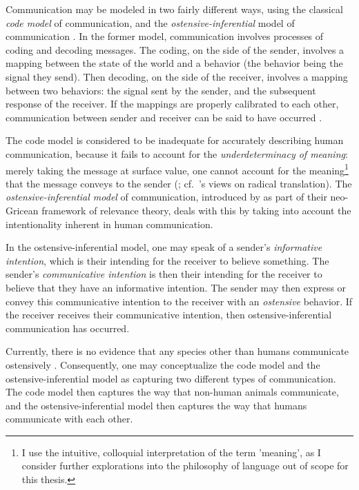 Communication may be modeled in two fairly different ways, using the classical \emph{code model} of communication, and the \emph{ostensive-inferential} model of communication \citep{Scott-Phillips15-primate}.
In the former model, communication involves processes of coding and decoding messages. The coding, on the side of the sender, involves a mapping between the state of the world and a behavior (the behavior being the signal they send). Then decoding, on the side of the receiver, involves a mapping between two behaviors: the signal sent by the sender, and the subsequent response of the receiver. If the mappings are properly calibrated to each other, communication between sender and receiver can be said to have occurred \citep{Scott-Phillips15-primate}.

The code model is considered to be inadequate for accurately describing human communication, because it fails to account for the \emph{underdeterminacy of meaning}: merely taking the message at surface value, one cannot account for the meaning\footnote{I use the intuitive, colloquial interpretation of the term 'meaning', as I consider further explorations into the philosophy of language out of scope for this thesis.} that the message conveys to the sender (\citet{Scott-Phillips18-communication}; cf.~\citet{Quine60}'s views on radical translation).
The \emph{ostensive-inferential model} of communication, introduced by \citet{SperberWilson86} as part of their neo-Gricean framework of relevance theory, deals with this by taking into account the intentionality inherent in human communication.

In the ostensive-inferential model, one may speak of a sender's \emph{informative intention}, which is their intending for the receiver to believe something. The sender's \emph{communicative intention} is then their intending for the receiver to believe that they have an informative intention. The sender may then express or convey this communicative intention to the receiver with an \emph{ostensive} behavior. If the receiver receives their communicative intention, then ostensive-inferential communication has occurred.

Currently, there is no evidence that any species other than humans communicate ostensively \citep{Scott-Phillips18-communication}. Consequently, one may conceptualize the code model and the ostensive-inferential model as capturing two different types of communication. The code model then captures the way that non-human animals communicate, and the ostensive-inferential model then captures the way that humans communicate with each other.

